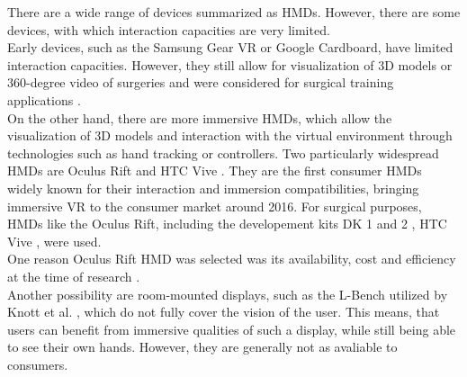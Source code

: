 There are a wide range of devices summarized as HMDs.
However, there are some devices, with which interaction capacities are very limited.
\\ Early devices, such as the Samsung Gear VR or Google Cardboard, have limited interaction capacities.
However, they still allow for visualization of 3D models or 360-degree video of surgeries and were considered for surgical training applications \cite{sararit2017vr, gomez2019techniques}.
\\ On the other hand, there are more immersive HMDs, which allow the visualization of 3D models and interaction with the virtual environment 
through technologies such as hand tracking or controllers.
Two particularly widespread HMDs are Oculus Rift \cite{OculusRift} and HTC Vive \cite{Vive}.
They are the first consumer HMDs widely known for their interaction and immersion compatibilities, bringing immersive VR to the consumer market around 2016.
For surgical purposes, HMDs like the Oculus Rift, including the developement kits DK 1 and 2 \cite{Parham.2019, Pulijala.2017,Sampogna.2017}, HTC 
Vive \cite{.2017, Barber.2020}, were used.
\\ One reason Oculus Rift HMD was selected was its availability, cost and efficiency at the time of research \cite{Pulijala.2017}.
\\ Another possibility are room-mounted displays, such 
as the L-Bench utilized by Knott et al. \cite{RN69}, which do not fully
cover the vision of the user. This means, that users can 
benefit from immersive qualities of such a display, while 
still being able to see their own hands. However,
they are generally not as avaliable to consumers.
